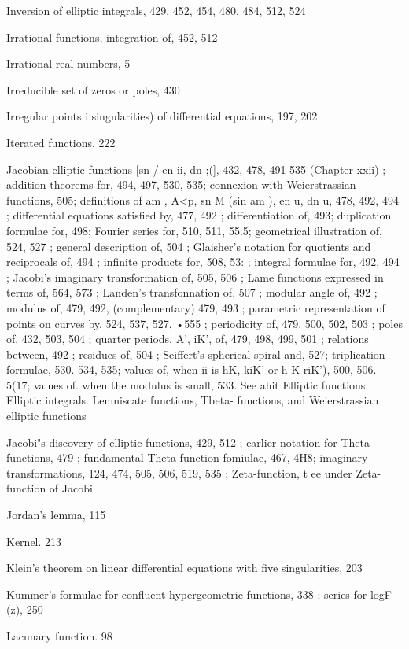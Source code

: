 Inversion of elliptic integrals, 429, 452, 454, 480, 484, 512, 524

Irrational functions, integration of, 452, 512

Irrational-real numbers, 5


%
%

Irreducible set of zeros or poles, 430

Irregular points i singularities) of differential equations, 197, 202

Iterated functions. 222

Jacobian elliptic functions [sn /  en ii, dn ;(], 432, 478, 491-535 (Chapter xxii) ; addition theorems
for, 494, 497, 530, 535; connexion with Weierstrassian functions, 505; definitions of am  ,
A<p, sn M (sin am  ), en u, dn u, 478, 492, 494 ; differential equations satisfied by, 477, 492 ;
differentiation of, 493; duplication formulae for, 498; Fourier series for, 510, 511, 55.5;
geometrical illustration of, 524, 527 ; general description of, 504 ; Glaisher's notation for
quotients and reciprocals of, 494 ; infinite products for, 508, 53:  ; integral formulae for, 492,
494 ; Jacobi's imaginary transformation of, 505, 506 ; Lame functions expressed in terms of,
564, 573 ; Landen's transfonnation of, 507 ; modular angle of, 492 ; modulus of, 479, 492,
(complementary) 479, 493 ; parametric representation of points on curves by, 524, 537, 527,
•555 ; periodicity of, 479, 500, 502, 503 ; poles of, 432, 503, 504 ; quarter periods. A', iK', of,
479, 498, 499, 501 ; relations between, 492 ; residues of, 504 ; Seiffert's spherical spiral and,
527; triplication formulae, 530. 534, 535; values of, when ii is hK, kiK' or h  K riK'), 500,
506. 5(17; values of. when the modulus is small, 533. See ahit Elliptic functions. Elliptic
integrals. Lemniscate functions, Tbeta- functions, and Weierstrassian elliptic functions

Jacobi"s discovery of elliptic functions, 429, 512 ; earlier notation for Theta-functions, 479 ;
fundamental Theta-function fomiulae, 467, 4H8; imaginary transformations, 124, 474, 505,
506, 519, 535 ; Zeta-function, t ee under Zeta-function of Jacobi

Jordan's lemma, 115

Kernel. 213

Klein's theorem on linear differential equations with five singularities, 203

Kummer's formulae for confluent hypergeometric functions, 338 ; series for logF (z), 250

Lacunary function. 98

